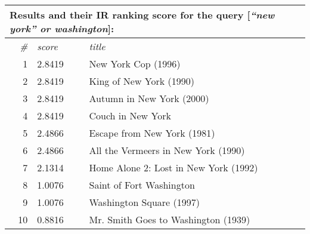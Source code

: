 \begin{table}[h]
  \centering 

  \begin{tabular*}{0.9\textwidth}{ r l p{8cm} }
    \multicolumn{3}{l}{Results and their IR ranking score for the query [\emph{``new york'' or washington}]:}\\
    \toprule
    \emph{\#} & \emph{score} & \emph{title}\\
    \midrule
    1 & 2.8419  &  New York Cop (1996)                    \\
    2 & 2.8419  &  King of New York (1990)                \\
    3 & 2.8419  &  Autumn in New York (2000)              \\
    4 & 2.8419  &  Couch in New York                      \\
    5 & 2.4866  &  Escape from New York (1981)            \\
    6 & 2.4866  &  All the Vermeers in New York (1990)    \\
    7 & 2.1314  &  Home Alone 2: Lost in New York (1992)  \\
    8 & 1.0076  &  Saint of Fort Washington               \\
    9 & 1.0076  &  Washington Square (1997)               \\
    10& 0.8816  &  Mr. Smith Goes to Washington (1939)    \\
    \bottomrule
  \end{tabular*}

  \vspace{1em} 


\end{table}
